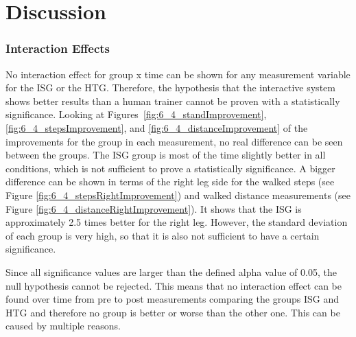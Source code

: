 \section{Discussion}\label{6_discussion}

\subsubsection{Interaction Effects}\label{6_5_interactionEffects}
No interaction effect for group x time can be shown for any measurement variable for the ISG or the HTG.
Therefore, the hypothesis that the interactive system shows better results than a human trainer cannot be proven with a statistically significance.
Looking at Figures~\ref{fig:6_4_standImprovement}, \ref{fig:6_4_stepsImprovement}, and \ref{fig:6_4_distanceImprovement} of the improvements for the group in each measurement, no real difference can be seen between the groups.
The ISG group is most of the time slightly better in all conditions, which is not sufficient to prove a statistically significance.
A bigger difference can be shown in terms of the right leg side for the walked steps (see Figure \ref{fig:6_4_stepsRightImprovement}) and walked distance measurements (see Figure \ref{fig:6_4_distanceRightImprovement}).
It shows that the ISG is approximately 2.5 times better for the right leg.
However, the standard deviation of each group is very high, so that it is also not sufficient to have a certain significance.

Since all significance values are larger than the defined alpha value of 0.05, the null hypothesis cannot be rejected.
This means that no interaction effect can be found over time from pre to post measurements comparing the groups ISG and HTG and therefore no group is better or worse than the other one.
This can be caused by multiple reasons.

